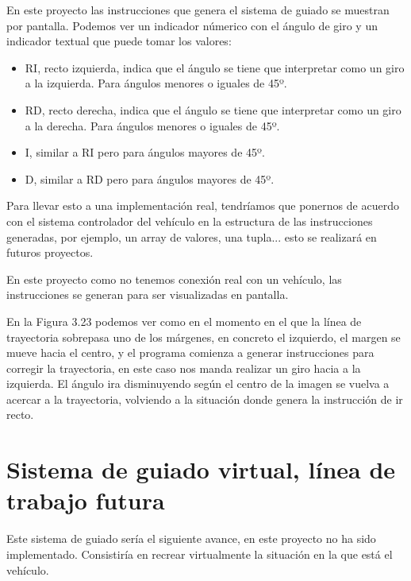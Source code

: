En este proyecto las instrucciones que genera el sistema de guiado se muestran por pantalla. Podemos ver un indicador númerico con el ángulo de giro y un indicador textual que puede tomar los valores:

\begin{itemize}

	\item RI, recto izquierda, indica que el ángulo se tiene que interpretar como un giro a la izquierda. Para ángulos menores o iguales de 45º.
	
	\item RD, recto derecha, indica que el ángulo se tiene que interpretar como un giro a la derecha. Para ángulos menores o iguales de 45º.
	\item I, similar a RI pero para ángulos mayores de 45º.
	
	\item D, similar a RD pero para ángulos mayores de 45º.
	
\end{itemize}

Para llevar esto a una implementación real, tendríamos que ponernos de acuerdo con el sistema controlador del vehículo en la estructura de las instrucciones generadas, por ejemplo, un array de valores, una tupla... esto se realizará en futuros proyectos.

En este proyecto como no tenemos conexión real con un vehículo, las instrucciones se generan para ser visualizadas en pantalla.


En la Figura 3.23 podemos ver como en el momento en el que la línea de trayectoria sobrepasa uno de los márgenes, en concreto el izquierdo, el margen se mueve hacia el centro, y el programa comienza a generar instrucciones para corregir la trayectoria, en este caso nos manda realizar un giro hacia a la izquierda. El ángulo ira disminuyendo según el centro de la imagen se vuelva a acercar a la trayectoria, volviendo a la situación donde genera la instrucción de ir recto.


\section{Sistema de guiado virtual, línea de trabajo futura}
Este sistema de guiado sería el siguiente avance, en este proyecto no ha sido implementado. Consistiría en recrear virtualmente la situación en la que está el vehículo. 

